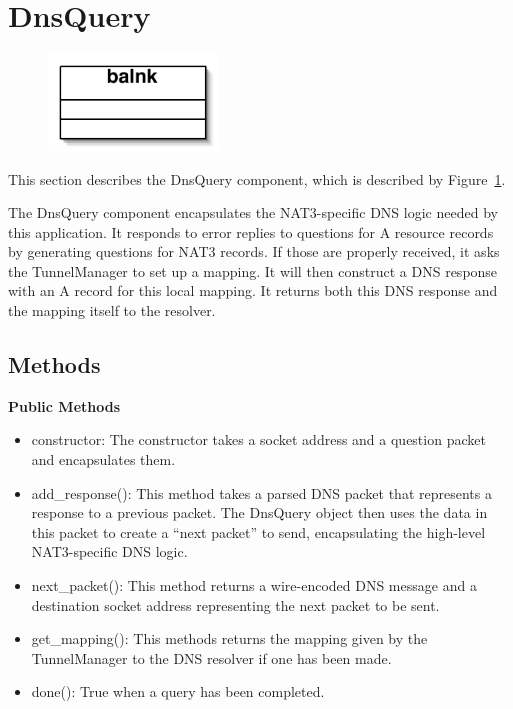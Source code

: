 \section{DnsQuery}\label{sec:dnsquery}

\begin{figure}
\begin{center}
\includegraphics[width=0.4\textwidth]{figs/blank}
\end{center}
\caption{}
\label{fig:}
\end{figure}

This section describes the DnsQuery component, which is described by Figure~\ref{fig:}.  

The DnsQuery component encapsulates the NAT3-specific DNS logic needed by this application. It responds to error replies to questions for A resource records by generating questions for NAT3 records. If those are properly received, it asks the TunnelManager to set up a mapping. It will then construct a DNS response with an A record for this local mapping. It returns both this DNS response and the mapping itself to the resolver.

\subsection{Methods}

{\bf Public Methods}
\begin{itemize}
\item constructor: The constructor takes a socket address and a question packet and encapsulates them.
\item add\_response(): This method takes a parsed DNS packet that represents a response to a previous packet. The DnsQuery object then uses the data in this packet to create a ``next packet'' to send, encapsulating the high-level NAT3-specific DNS logic.
\item next\_packet(): This method returns a wire-encoded DNS message and a destination socket address representing the next packet to be sent.
\item get\_mapping(): This methods returns the mapping given by the TunnelManager to the DNS resolver if one has been made.
\item done(): True when a query has been completed.
\end{itemize}

